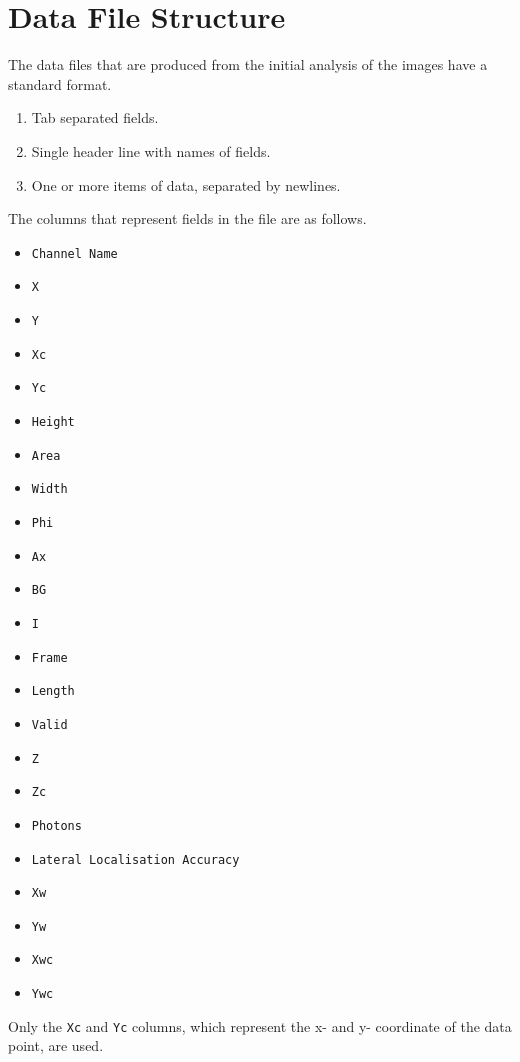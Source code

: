 
\chapter{Data File Structure}
\label{app:data_file_structure}

The data files that are produced from the initial analysis of the images have a
standard format.

\begin{enumerate}
	\item Tab separated fields.
	\item Single header line with names of fields.
	\item One or more items of data, separated by newlines.
\end{enumerate}

The columns that represent fields in the file are as follows.

\begin{multicols}{2}
\begin{itemize}
		\item \texttt{Channel Name}
		\item \texttt{X}
		\item \texttt{Y}
		\item \texttt{Xc}
		\item \texttt{Yc}
		\item \texttt{Height}
		\item \texttt{Area}
		\item \texttt{Width}
		\item \texttt{Phi}
		\item \texttt{Ax}
		\item \texttt{BG}
		\item \texttt{I}
		\item \texttt{Frame}
		\item \texttt{Length}
		\item \texttt{Valid}
		\item \texttt{Z}
		\item \texttt{Zc}
		\item \texttt{Photons}
		\item \texttt{Lateral Localisation Accuracy}
		\item \texttt{Xw}
		\item \texttt{Yw}
		\item \texttt{Xwc}
		\item \texttt{Ywc}
\end{itemize}
\end{multicols}

Only the \texttt{Xc} and \texttt{Yc} columns, which represent the x- and y-
coordinate of the data point, are used.
